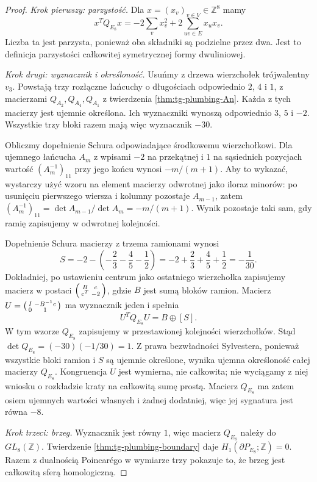 \begin{proof}
\emph{Krok pierwszy: parzystość.}
Dla $x=(x_v)_{v\in V}\in\mathbb Z^8$ mamy
\[
x^TQ_{E_8}x=-2\sum_vx_v^2+2\sum_{uv\in E}x_ux_v.
\]
Liczba ta jest parzysta, ponieważ oba składniki są
podzielne przez dwa. Jest to definicja parzystości
całkowitej symetrycznej formy dwuliniowej.

\emph{Krok drugi: wyznacznik i określoność.}
Usuńmy z drzewa wierzchołek trójwalentny $v_3$.
Powstają trzy rozłączne łańcuchy o długościach odpowiednio
$2$, $4$ i $1$, z macierzami $Q_{A_2},Q_{A_4},Q_{A_1}$
z twierdzenia \ref{thm:tg-plumbing-An}.
Każda z tych macierzy jest ujemnie określona.
Ich wyznaczniki wynoszą odpowiednio $3$, $5$ i $-2$.
Wszystkie trzy bloki razem mają więc wyznacznik $-30$.

Obliczmy dopełnienie Schura odpowiadające środkowemu
wierzchołkowi. Dla ujemnego łańcucha $A_m$ z
wpisami $-2$ na przekątnej i $1$ na sąsiednich
pozycjach wartość $(A_m^{-1})_{11}$ przy jego końcu
wynosi $-m/(m+1)$. Aby to wykazać, wystarczy użyć
wzoru na element macierzy odwrotnej jako iloraz
minorów: po usunięciu pierwszego wiersza i kolumny
pozostaje $A_{m-1}$, zatem
$(A_m^{-1})_{11}=\det A_{m-1}/\det A_m=-m/(m+1)$.
Wynik pozostaje taki sam, gdy ramię zapisujemy w
odwrotnej kolejności.

Dopełnienie Schura macierzy z trzema ramionami wynosi
\[
S=-2-\left(-\frac23-\frac45-\frac12\right)
=-2+\frac23+\frac45+\frac12=-\frac1{30}.
\]
Dokładniej, po ustawieniu centrum jako ostatniego
wierzchołka zapisujemy macierz w postaci
$\begin{psmallmatrix}B&c\\c^T&-2\end{psmallmatrix}$,
gdzie $B$ jest sumą bloków ramion.
Macierz
$U=\begin{psmallmatrix}I&-B^{-1}c\\0&1\end{psmallmatrix}$
ma wyznacznik jeden i spełnia
\[
U^TQ_{E_8}U=B\oplus[S].
\]
W tym wzorze $Q_{E_8}$ zapisujemy w przestawionej
kolejności wierzchołków. Stąd
$\det Q_{E_8}=(-30)(-1/30)=1$.
Z prawa bezwładności Sylvestera, ponieważ
wszystkie bloki ramion i $S$ są ujemnie
określone, wynika ujemna określoność
całej macierzy $Q_{E_8}$.
Kongruencja $U$ jest wymierna, nie całkowita;
nie wyciągamy z niej wniosku o rozkładzie kraty
na całkowitą sumę prostą. Macierz $Q_{E_8}$ ma zatem osiem
ujemnych wartości własnych i żadnej dodatniej,
więc jej sygnatura jest równa $-8$.

\emph{Krok trzeci: brzeg.}
Wyznacznik jest równy $1$, więc macierz $Q_{E_8}$
należy do $GL_8(\mathbb Z)$. Twierdzenie
\ref{thm:tg-plumbing-boundary} daje
$H_1(\partial P_{E_8};\mathbb Z)=0$.
Razem z dualnością Poincarégo w wymiarze trzy
pokazuje to, że brzeg jest całkowitą sferą homologiczną.
\end{proof}

